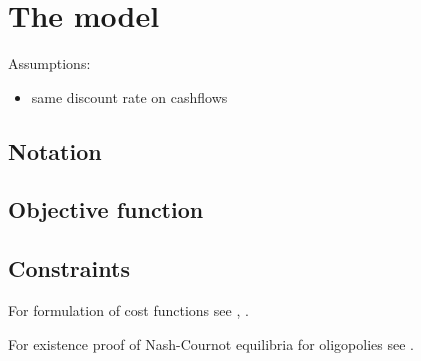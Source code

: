\section{The model}

Assumptions:

\begin{itemize}
	\item same discount rate on cashflows
\end{itemize}

\subsection{Notation}

\subsection{Objective function}

\subsection{Constraints}

For formulation of cost functions see \cite{Bergman1995}, \cite{Pineau2003}.	

For existence proof of Nash-Cournot equilibria for oligopolies see \cite{Murphy1982}.